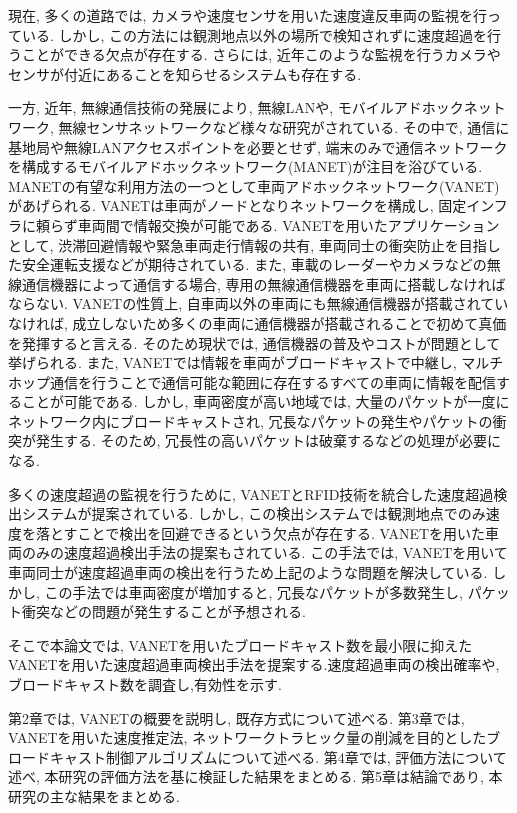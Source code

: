 \documentclass[10pt]{jreport}
\begin{document}
現在, 多くの道路では, カメラや速度センサを用いた速度違反車両の監視を行っている. しかし, この方法には観測地点以外の場所で検知されずに速度超過を行うことができる欠点が存在する. さらには, 近年このような監視を行うカメラやセンサが付近にあることを知らせるシステムも存在する\cite{sample2}. 
 
一方, 近年, 無線通信技術の発展により, 無線LANや, モバイルアドホックネットワーク, 無線センサネットワークなど様々な研究がされている. その中で, 通信に基地局や無線LANアクセスポイントを必要とせず, 端末のみで通信ネットワークを構成するモバイルアドホックネットワーク(MANET)が注目を浴びている. MANETの有望な利用方法の一つとして車両アドホックネットワーク(VANET)\cite{sample3}があげられる. VANETは車両がノードとなりネットワークを構成し, 固定インフラに頼らず車両間で情報交換が可能である. VANETを用いたアプリケーションとして, 渋滞回避情報や緊急車両走行情報の共有, 車両同士の衝突防止を目指した安全運転支援などが期待されている\cite{sample4}\cite{sample5}. また, 車載のレーダーやカメラなどの無線通信機器によって通信する場合, 専用の無線通信機器を車両に搭載しなければならない. VANETの性質上, 自車両以外の車両にも無線通信機器が搭載されていなければ, 成立しないため多くの車両に通信機器が搭載されることで初めて真価を発揮すると言える. そのため現状では, 通信機器の普及やコストが問題として挙げられる. また, VANETでは情報を車両がブロードキャストで中継し, マルチホップ通信を行うことで通信可能な範囲に存在するすべての車両に情報を配信することが可能である. しかし, 車両密度が高い地域では, 大量のパケットが一度にネットワーク内にブロードキャストされ, 冗長なパケットの発生やパケットの衝突が発生する\cite{sample6}. そのため, 冗長性の高いパケットは破棄するなどの処理が必要になる.

多くの速度超過の監視を行うために, VANETとRFID技術を統合した速度超過検出システムが提案されている\cite{sample14}. しかし, この検出システムでは観測地点でのみ速度を落とすことで検出を回避できるという欠点が存在する. VANETを用いた車両のみの速度超過検出手法の提案もされている\cite{sample10}. この手法では, VANETを用いて車両同士が速度超過車両の検出を行うため上記のような問題を解決している. しかし, この手法では車両密度が増加すると, 冗長なパケットが多数発生し, パケット衝突などの問題が発生することが予想される.

そこで本論文では, VANETを用いたブロードキャスト数を最小限に抑えたVANETを用いた速度超過車両検出手法を提案する.速度超過車両の検出確率や,ブロードキャスト数を調査し,有効性を示す.

第2章では, VANETの概要を説明し, 既存方式について述べる. 第3章では, VANETを用いた速度推定法, ネットワークトラヒック量の削減を目的としたブロードキャスト制御アルゴリズムについて述べる. 第4章では, 評価方法について述べ, 本研究の評価方法を基に検証した結果をまとめる. 第5章は結論であり, 本研究の主な結果をまとめる. 
\end{document}
